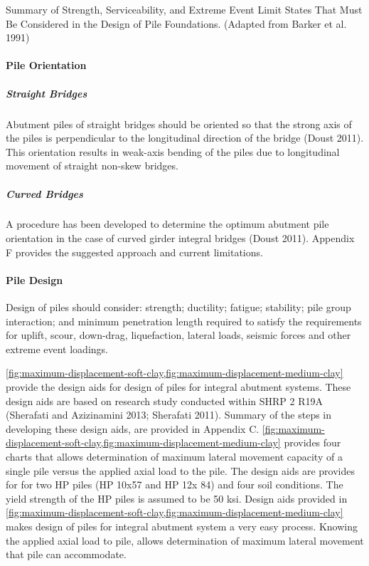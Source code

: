 \begin{table}
  \caption{Summary of Strength, Serviceability, and Extreme Event Limit States That Must Be Considered in the Design of Pile Foundations. (Adapted from Barker et al. 1991)}
  \label{tab:summary-limit-states}
\end{table}

\paragraph{Pile Orientation}
\subparagraph{Straight Bridges}
Abutment piles of straight bridges should be oriented so that the strong axis of the piles is perpendicular to the
longitudinal direction of the bridge (Doust 2011). This orientation results in weak-axis bending of the piles due to
longitudinal movement of straight non-skew bridges.

\subparagraph{Curved Bridges}
A procedure has been developed to determine the optimum abutment pile orientation in the case of curved girder
integral bridges (Doust 2011). Appendix F provides the suggested approach and current limitations.

\paragraph{Pile Design}
Design of piles should consider: strength; ductility; fatigue; stability; pile group interaction; and minimum
penetration length required to satisfy the requirements for uplift, scour, down-drag, liquefaction, lateral loads, seismic
forces and other extreme event loadings.

\cref{fig:maximum-displacement-soft-clay,fig:maximum-displacement-medium-clay} provide the design aids for design of piles for integral abutment systems. These design aids are based on research study conducted within SHRP 2 R19A (Sherafati and Azizinamini 2013; Sherafati 2011). Summary of the steps in developing these design aids, are provided in Appendix C. \cref{fig:maximum-displacement-soft-clay,fig:maximum-displacement-medium-clay} provides four charts that allows determination of maximum lateral movement capacity of a single pile versus the applied axial load to the pile. The design aids are provides for for two HP piles (HP 10x57 and HP 12x 84) and four soil conditions. The yield strength of the HP piles is assumed to be 50 ksi. Design aids provided in \cref{fig:maximum-displacement-soft-clay,fig:maximum-displacement-medium-clay} makes design of piles for integral abutment system a very easy process. Knowing the applied axial load to pile, allows determination of maximum lateral movement that pile can accommodate.

